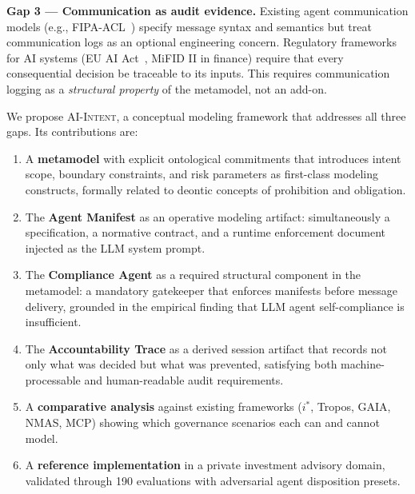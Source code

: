 \documentclass[runningheads]{llncs}
\begin{document}
\textbf{Gap 3 — Communication as audit evidence.} Existing agent
communication models (e.g., FIPA-ACL~\cite{fipa2002}) specify message
syntax and semantics but treat communication logs as an optional
engineering concern. Regulatory frameworks for AI systems (EU AI
Act~\cite{euaiact2024}, MiFID II in finance) require that every
consequential decision be traceable to its inputs. This requires
communication logging as a \emph{structural property} of the
metamodel, not an add-on.

We propose \textsc{AI-Intent}, a conceptual modeling framework that
addresses all three gaps. Its contributions are:

\begin{enumerate}
    \item A \textbf{metamodel} with explicit ontological commitments that
    introduces intent scope, boundary constraints, and risk parameters as
    first-class modeling constructs, formally related to deontic concepts
    of prohibition and obligation.

    \item The \textbf{Agent Manifest} as an operative modeling artifact:
    simultaneously a specification, a normative contract, and a runtime
    enforcement document injected as the LLM system prompt.

    \item The \textbf{Compliance Agent} as a required structural
    component in the metamodel: a mandatory gatekeeper that enforces
    manifests before message delivery, grounded in the empirical finding
    that LLM agent self-compliance is insufficient.

    \item The \textbf{Accountability Trace} as a derived session artifact
    that records not only what was decided but what was prevented,
    satisfying both machine-processable and human-readable audit
    requirements.

    \item A \textbf{comparative analysis} against existing frameworks
    ($i^*$, Tropos, GAIA, NMAS, MCP) showing which governance scenarios
    each can and cannot model.

    \item A \textbf{reference implementation} in a private investment
    advisory domain, validated through 190 evaluations with adversarial
    agent disposition presets.
\end{enumerate}

\end{document}
